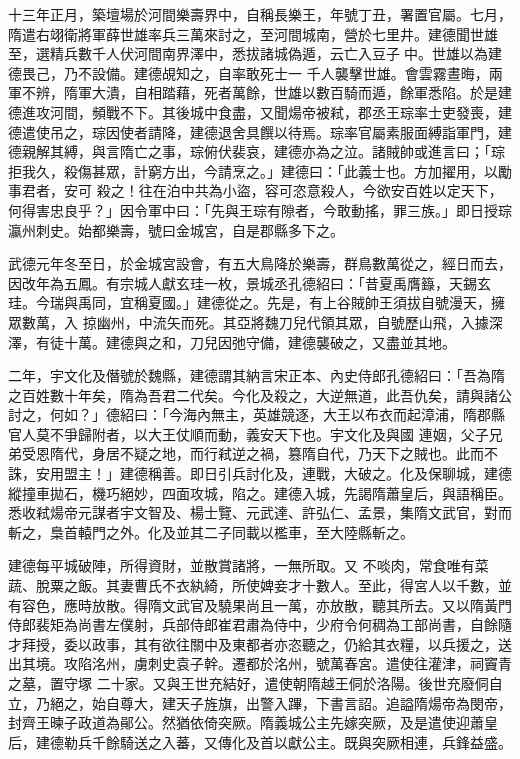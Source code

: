 \begin{pinyinscope}
 十三年正月，築壇場於河間樂壽界中，自稱長樂王，年號丁丑，署置官屬。七月，隋遣右翊衛將軍薛世雄率兵三萬來討之，至河間城南，營於七里井。建德聞世雄至，選精兵數千人伏河間南界澤中，悉拔諸城偽遁，云亡入豆子中。世雄以為建德畏己，乃不設備。建德覘知之，自率敢死士一
 千人襲擊世雄。會雲霧晝晦，兩軍不辨，隋軍大潰，自相踏藉，死者萬餘，世雄以數百騎而遁，餘軍悉陷。於是建德進攻河間，頻戰不下。其後城中食盡，又聞煬帝被弒，郡丞王琮率士吏發喪，建德遣使吊之，琮因使者請降，建德退舍具饌以待焉。琮率官屬素服面縛詣軍門，建德親解其縛，與言隋亡之事，琮俯伏裴哀，建德亦為之泣。諸賊帥或進言曰；「琮拒我久，殺傷甚眾，計窮方出，今請烹之。」建德曰：「此義士也。方加擢用，以勵事君者，安可
 殺之！往在泊中共為小盜，容可恣意殺人，今欲安百姓以定天下，何得害忠良乎？」因令軍中曰：「先與王琮有隙者，今敢動搖，罪三族。」即日授琮瀛州刺史。始都樂壽，號曰金城宮，自是郡縣多下之。



 武德元年冬至日，於金城宮設會，有五大鳥降於樂壽，群鳥數萬從之，經日而去，因改年為五鳳。有宗城人獻玄珪一枚，景城丞孔德紹曰：「昔夏禹膺籙，天錫玄珪。今瑞與禹同，宜稱夏國。」建德從之。先是，有上谷賊帥王須拔自號漫天，擁眾數萬，入
 掠幽州，中流矢而死。其亞將魏刀兒代領其眾，自號歷山飛，入據深澤，有徒十萬。建德與之和，刀兒因弛守備，建德襲破之，又盡並其地。



 二年，宇文化及僭號於魏縣，建德謂其納言宋正本、內史侍郎孔德紹曰：「吾為隋之百姓數十年矣，隋為吾君二代矣。今化及殺之，大逆無道，此吾仇矣，請與諸公討之，何如？」德紹曰：「今海內無主，英雄競逐，大王以布衣而起漳浦，隋郡縣官人莫不爭歸附者，以大王仗順而動，義安天下也。宇文化及與國
 連姻，父子兄弟受恩隋代，身居不疑之地，而行弒逆之禍，篡隋自代，乃天下之賊也。此而不誅，安用盟主！」建德稱善。即日引兵討化及，連戰，大破之。化及保聊城，建德縱撞車拋石，機巧絕妙，四面攻城，陷之。建德入城，先謁隋蕭皇后，與語稱臣。悉收弒煬帝元謀者宇文智及、楊士覽、元武達、許弘仁、孟景，集隋文武官，對而斬之，梟首轅門之外。化及並其二子同載以檻車，至大陸縣斬之。



 建德每平城破陣，所得資財，並散賞諸將，一無所取。又
 不啖肉，常食唯有菜蔬、脫粟之飯。其妻曹氏不衣紈綺，所使婢妾才十數人。至此，得宮人以千數，並有容色，應時放散。得隋文武官及驍果尚且一萬，亦放散，聽其所去。又以隋黃門侍郎裴矩為尚書左僕射，兵部侍郎崔君肅為侍中，少府令何稠為工部尚書，自餘隨才拜授，委以政事，其有欲往關中及東都者亦恣聽之，仍給其衣糧，以兵援之，送出其境。攻陷洺州，虜刺史袁子幹。遷都於洺州，號萬春宮。遣使往灌津，祠竇青之墓，置守塚
 二十家。又與王世充結好，遣使朝隋越王侗於洛陽。後世充廢侗自立，乃絕之，始自尊大，建天子旌旗，出警入蹕，下書言詔。追謚隋煬帝為閔帝，封齊王暕子政道為鄖公。然猶依倚突厥。隋義城公主先嫁突厥，及是遣使迎蕭皇后，建德勒兵千餘騎送之入蕃，又傳化及首以獻公主。既與突厥相連，兵鋒益盛。




\end{pinyinscope}
